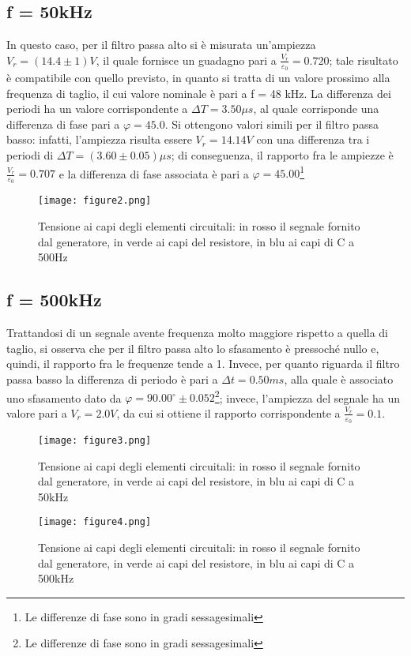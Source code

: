 \documentclass{article}
\begin{document}
\subsection{f = 50kHz}
In questo caso, per il filtro passa alto si è misurata un’ampiezza $V_r = (14.4 \pm 1) V$, il quale fornisce un guadagno pari a $\frac{V_r}{\varepsilon_0} = 0.720$; tale risultato è compatibile
con quello previsto, in quanto si tratta di un valore prossimo alla frequenza di
taglio, il cui valore nominale è pari a f = 48 kHz. La differenza dei periodi ha
un valore corrispondente a $\Delta T = 3.50 \mu s$, al quale corrisponde una differenza di
fase pari a $\varphi =45.0$. Si ottengono valori simili per il filtro passa basso: infatti, l’ampiezza risulta essere $V_r = 14.14 V$ con una differenza tra i periodi di $\Delta T =
(3.60 \pm 0.05) \mu s$; di conseguenza, il rapporto fra le ampiezze è $\frac{V_r}{\varepsilon_0} = 0.707$ e la
differenza di fase associata è pari a $\varphi= 45.00$\footnote{Le differenze di fase sono in gradi sessagesimali}
\begin{figure}
    \centering
    \texttt{[image: figure2.png]}
    \caption{Tensione ai capi degli elementi circuitali: in rosso il segnale fornito dal generatore, in verde ai capi del resistore, in blu ai capi di C a 500Hz}
    \label{figura2}
\end{figure}

\subsection{f = 500kHz}
Trattandosi di un segnale avente frequenza molto maggiore rispetto a quella di
taglio, si osserva che per il filtro passa alto lo sfasamento è pressoché nullo e,
quindi, il rapporto fra le frequenze tende a 1. Invece, per quanto riguarda il filtro
passa basso la differenza di periodo è pari a $\Delta t = 0.50 ms$, alla quale è associato uno sfasamento dato da $\varphi = 90.00^{\circ} \pm 0.052$\footnote{Le differenze di fase sono in gradi sessagesimali}; invece, l’ampiezza del segnale ha un
valore pari a $V_r = 2.0 V$, da cui si ottiene il rapporto corrispondente a $\frac{V_r}{\varepsilon_0} = 0.1$.
\begin{figure}
    \centering
    \texttt{[image: figure3.png]}
    \caption{Tensione ai capi degli elementi circuitali: in rosso il segnale fornito dal generatore, in verde ai capi del resistore, in blu ai capi di C a 50kHz}
    \label{figura3}
\end{figure}
\begin{figure}
    \centering
    \texttt{[image: figure4.png]}
    \caption{Tensione ai capi degli elementi circuitali: in rosso il segnale fornito dal generatore, in verde ai capi del resistore, in blu ai capi di C a 500kHz}
    \label{figura4}
\end{figure}
\end{document}

